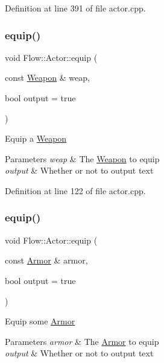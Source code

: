 Definition at line 391 of file actor.\+cpp.

\hypertarget{class_flow_1_1_actor_a2b2c31fc34e8aae951764f80730479e0}{}\label{class_flow_1_1_actor_a2b2c31fc34e8aae951764f80730479e0} 
\subsubsection{\texorpdfstring{equip()}{equip()}\hspace{0.1cm}{\footnotesize\ttfamily [1/2]}}
{\footnotesize\ttfamily void Flow\+::\+Actor\+::equip (\begin{DoxyParamCaption}\item[{const \hyperlink{class_flow_1_1_weapon}{Weapon} \&}]{weap,  }\item[{bool}]{output = {\ttfamily true} }\end{DoxyParamCaption})}

Equip a \hyperlink{class_flow_1_1_weapon}{Weapon} 
\begin{DoxyParams}{Parameters}
{\em weap} & The \hyperlink{class_flow_1_1_weapon}{Weapon} to equip \\
\hline
{\em output} & Whether or not to output text \\
\hline
\end{DoxyParams}


Definition at line 122 of file actor.\+cpp.

\hypertarget{class_flow_1_1_actor_aa3e3371f1fde52c0dae09ba6f34bb599}{}\label{class_flow_1_1_actor_aa3e3371f1fde52c0dae09ba6f34bb599} 
\subsubsection{\texorpdfstring{equip()}{equip()}\hspace{0.1cm}{\footnotesize\ttfamily [2/2]}}
{\footnotesize\ttfamily void Flow\+::\+Actor\+::equip (\begin{DoxyParamCaption}\item[{const \hyperlink{class_flow_1_1_armor}{Armor} \&}]{armor,  }\item[{bool}]{output = {\ttfamily true} }\end{DoxyParamCaption})}

Equip some \hyperlink{class_flow_1_1_armor}{Armor} 
\begin{DoxyParams}{Parameters}
{\em armor} & The \hyperlink{class_flow_1_1_armor}{Armor} to equip \\
\hline
{\em output} & Whether or not to output text \\
\hline
\end{DoxyParams}


